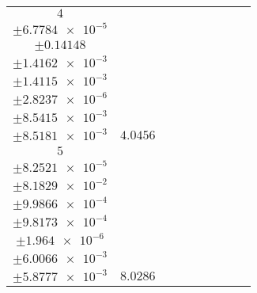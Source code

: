 \documentclass[8pt]{article}
\begin{document}
\begin{longtable}[l]{c c c c c c c c c}
$\num{4}$ & \begin{tabular}[c]{@{}c@{}}$\num{2.8521e-2}$ \\ $\pm\num{6.7784e-5}$\end{tabular} & \begin{tabular}[c]{@{}c@{}}$\num{-0.6907}$ \\ $\pm\num{0.14148}$\end{tabular} & \begin{tabular}[c]{@{}c@{}}$\num{2.9483}$ \\ $\pm\num{1.4162e-3}$\end{tabular} & \begin{tabular}[c]{@{}c@{}}$\num{1.1826e+3}$ \\ $\pm\num{1.4115e-3}$\end{tabular} & \begin{tabular}[c]{@{}c@{}}$\num{2.3659}$ \\ $\pm\num{2.8237e-6}$\end{tabular} & \begin{tabular}[c]{@{}c@{}}$\num{3.0774}$ \\ $\pm\num{8.5415e-3}$\end{tabular} & \begin{tabular}[c]{@{}c@{}}$\num{3.0627}$ \\ $\pm\num{8.5181e-3}$\end{tabular} & $\num{4.0456}$\\
$\num{5}$ & \begin{tabular}[c]{@{}c@{}}$\num{6.0113e-2}$ \\ $\pm\num{8.2521e-5}$\end{tabular} & \begin{tabular}[c]{@{}c@{}}$\num{0.52515}$ \\ $\pm\num{8.1829e-2}$\end{tabular} & \begin{tabular}[c]{@{}c@{}}$\num{7.1694}$ \\ $\pm\num{9.9866e-4}$\end{tabular} & \begin{tabular}[c]{@{}c@{}}$\num{1.1869e+3}$ \\ $\pm\num{9.8173e-4}$\end{tabular} & \begin{tabular}[c]{@{}c@{}}$\num{2.3744}$ \\ $\pm\num{1.964e-6}$\end{tabular} & \begin{tabular}[c]{@{}c@{}}$\num{3.769}$ \\ $\pm\num{6.0066e-3}$\end{tabular} & \begin{tabular}[c]{@{}c@{}}$\num{3.6971}$ \\ $\pm\num{5.8777e-3}$\end{tabular} & $\num{8.0286}$\\

\end{longtable}
\end{document}
